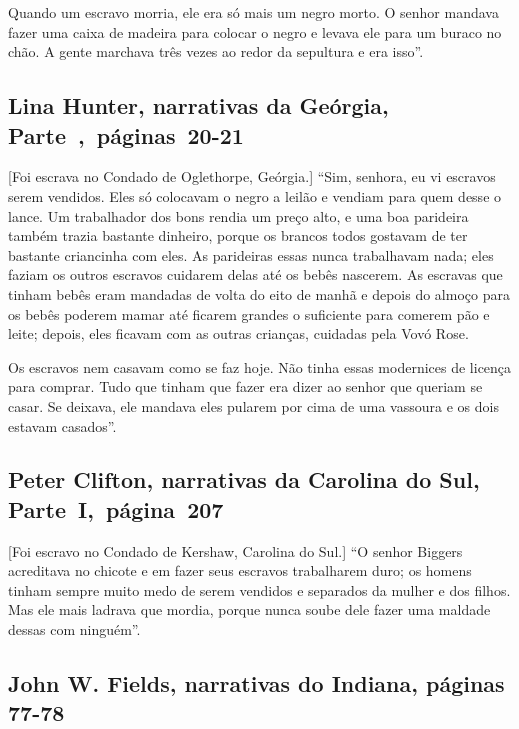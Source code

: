 Quando um escravo morria, ele era só mais um negro morto. O senhor
mandava fazer uma caixa de madeira para colocar o negro e levava ele
para um buraco no chão. A gente marchava três vezes ao redor da
sepultura e era isso''.

\subsection{Lina Hunter, narrativas da Geórgia, Parte~,~páginas~20-21}

{[}Foi escrava no Condado de Oglethorpe, Geórgia.{]} ``Sim, senhora, eu vi escravos serem vendidos. Eles só colocavam o negro
a leilão e vendiam para quem desse o lance. Um trabalhador dos bons
rendia um preço alto, e uma boa parideira também trazia bastante
dinheiro, porque os brancos todos gostavam de ter bastante criancinha
com eles. As parideiras essas nunca trabalhavam nada; eles faziam os
outros escravos cuidarem delas até os bebês nascerem. As escravas que
tinham bebês eram mandadas de volta do eito de manhã e depois do almoço
para os bebês poderem mamar até ficarem grandes o suficiente para
comerem pão e leite; depois, eles ficavam com as outras crianças,
cuidadas pela Vovó Rose.

Os escravos nem casavam como se faz hoje. Não tinha essas modernices de
licença para comprar. Tudo que tinham que fazer era dizer ao senhor que
queriam se casar. Se deixava, ele mandava eles pularem por cima de uma
vassoura e os dois estavam casados''.

\subsection{Peter Clifton, narrativas da Carolina do Sul, Parte~I,~página~207}

{[}Foi escravo no Condado de Kershaw, Carolina do Sul.{]} ``O senhor Biggers acreditava no chicote e em fazer seus escravos
trabalharem duro; os homens tinham sempre muito medo de serem vendidos e
separados da mulher e dos filhos. Mas ele mais ladrava que mordia,
porque nunca soube dele fazer uma maldade dessas com ninguém''.

\subsection{John W. Fields, narrativas do Indiana, páginas 77-78} \label{ref90}

